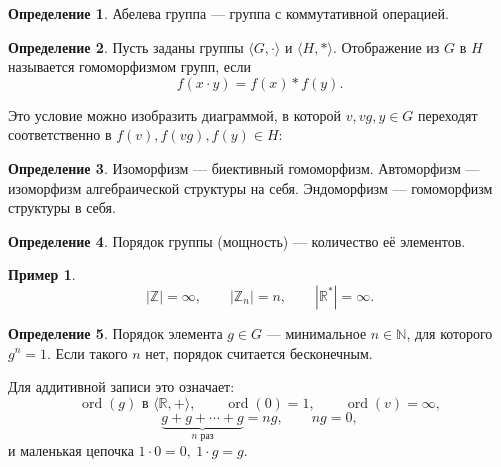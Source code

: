 \documentclass[12pt,a4paper,oneside,openany]{book}
\theoremstyle{definition}
\newtheorem{definition}{Определение}[chapter]
\newtheorem{example}{Пример}[chapter]
\theoremstyle{plain}
\theoremstyle{remark}
\DeclareMathOperator{\ord}{ord}
\newcommand{\N}{\mathbb{N}}
\newcommand{\Z}{\mathbb{Z}}
\newcommand{\R}{\mathbb{R}}
\begin{document}
\begin{definition}
Абелева группа --- группа с коммутативной операцией.
\end{definition}

\begin{definition}
Пусть заданы группы
\(\langle G,\cdot\rangle\) и \(\langle H,*\rangle\).
Отображение из \(G\) в \(H\) называется гомоморфизмом групп, если
\[
  f(x\cdot y)=f(x)*f(y).
\]
\end{definition}

Это условие можно изобразить диаграммой, в которой
\(v,vg,y\in G\) переходят соответственно в
\(f(v),f(vg),f(y)\in H\):

\begin{center}
\end{center}

\begin{definition}
Изоморфизм --- биективный гомоморфизм. Автоморфизм --- изоморфизм
алгебраической структуры на себя. Эндоморфизм --- гомоморфизм
структуры в себя.
\end{definition}

\begin{definition}
Порядок группы (мощность) --- количество её элементов.
\end{definition}

\begin{example}
\[
  |\Z|=\infty,\qquad |\Z_n|=n,\qquad |\R^*|=\infty.
\]
\end{example}

\begin{definition}
Порядок элемента \(g\in G\) --- минимальное \(n\in\N\), для которого
\(g^n=1\). Если такого $n$ нет, порядок считается бесконечным.
\end{definition}

Для аддитивной записи это означает:
\[
  \ord(g)\text{ в }\langle\R,+\rangle,\qquad
  \ord(0)=1,\qquad \ord(v)=\infty,
\]
\[
  \underbrace{g+g+\cdots+g}_{n\text{ раз}}=ng,\qquad ng=0,
\]
и маленькая цепочка \(1\cdot0=0,\ 1\cdot g=g\).
\end{document}
